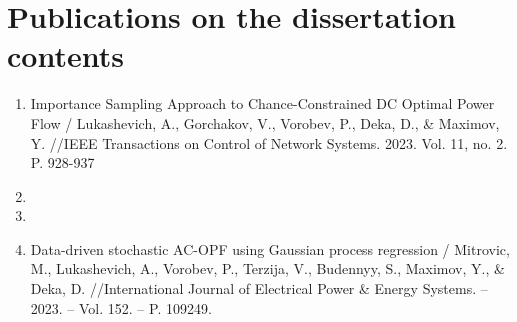 

\section*{Publications on the dissertation contents}

\begin{enumerate}
    \item Importance Sampling Approach to Chance-Constrained DC Optimal Power Flow / Lukashevich, A., Gorchakov, V., Vorobev, P., Deka, D., \& Maximov, Y. //IEEE Transactions on Control of Network Systems. 2023. Vol. 11, no. 2. P. 928-937
    \item {}
    \item {}
    \item Data-driven stochastic AC-OPF using Gaussian process regression / Mitrovic, M., Lukashevich, A., Vorobev, P., Terzija, V., Budennyy, S., Maximov, Y., \& Deka, D. //International Journal of Electrical Power \& Energy Systems. – 2023. – Vol. 152. – P. 109249.
\end{enumerate}

    


\printbibliography[heading=subbibliography]